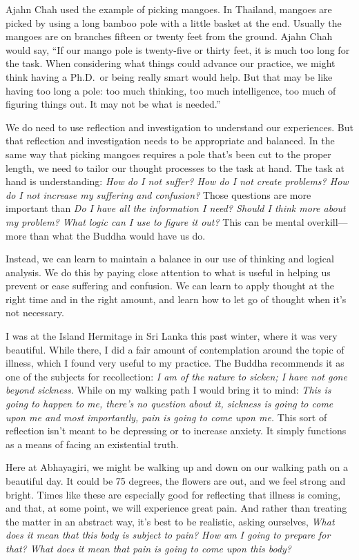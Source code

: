 Ajahn Chah used the example of picking mangoes. In Thailand, mangoes 
are picked by using a long bamboo pole with a little basket at the end. 
Usually the mangoes are on branches fifteen or twenty feet from the 
ground. Ajahn Chah would say, ``If our mango pole is twenty-five or 
thirty feet, it is much too long for the task. When considering what 
things could advance our practice, we might think having a Ph.D. or 
being really smart would help. But that may be like having too long a 
pole: too much thinking, too much intelligence, too much of figuring 
things out. It may not be what is needed.''

We do need to use reflection and investigation to understand our 
experiences. But that reflection and investigation needs to be 
appropriate and balanced. In the same way that picking mangoes requires 
a pole that's been cut to the proper length, we need to tailor our 
thought processes to the task at hand. The task at hand is 
understanding: \emph{How do I not suffer? How do I not create problems? 
How do I not increase my suffering and confusion?} Those questions are 
more important than \emph{Do I have all the information I need? Should 
I think more about my problem? What logic can I use to figure it out?} 
This can be mental overkill---more than what the Buddha would have us 
do.

Instead, we can learn to maintain a balance in our use of thinking and 
logical analysis. We do this by paying close attention to what is 
useful in helping us prevent or ease suffering and confusion. We can 
learn to apply thought at the right time and in the right amount, and 
learn how to let go of thought when it's not necessary.


I was at the Island Hermitage in Sri Lanka this past winter, where it 
was very beautiful. While there, I did a fair amount of contemplation 
around the topic of illness, which I found very useful to my practice. 
The Buddha recommends it as one of the subjects for recollection: 
\emph{I am of the nature to sicken; I have not gone beyond sickness.} 
While on my walking path I would bring it to mind: \emph{This is going 
to happen to me, there's no question about it, sickness is going to 
come upon me and most importantly, pain is going to come upon me.} This 
sort of reflection isn't meant to be depressing or to increase anxiety. 
It simply functions as a means of facing an existential truth.

Here at Abhayagiri, we might be walking up and down on our walking path 
on a beautiful day. It could be 75 degrees, the flowers are out, and we 
feel strong and bright. Times like these are especially good for 
reflecting that illness is coming, and that, at some point, we will 
experience great pain. And rather than treating the matter in an 
abstract way, it's best to be realistic, asking ourselves, \emph{What 
does it mean that this body is subject to pain? How am I going to 
prepare for that? What does it mean that pain is going to come upon 
this body?}

